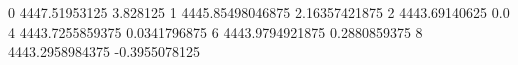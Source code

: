 0 4447.51953125 3.828125
1 4445.85498046875 2.16357421875
2 4443.69140625 0.0
4 4443.7255859375 0.0341796875
6 4443.9794921875 0.2880859375
8 4443.2958984375 -0.3955078125

